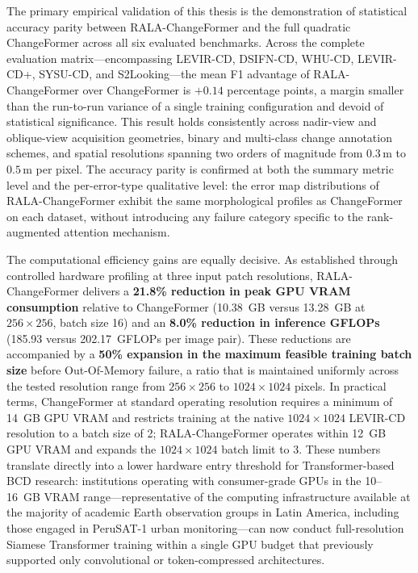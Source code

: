 The primary empirical validation of this thesis is the demonstration of
statistical accuracy parity between RALA-ChangeFormer and the full quadratic
ChangeFormer \cite{Bandara2022ChangeFormer} across all six evaluated benchmarks.
Across the complete evaluation matrix---encompassing LEVIR-CD, DSIFN-CD, WHU-CD,
LEVIR-CD+, SYSU-CD, and S2Looking---the mean F1 advantage of RALA-ChangeFormer
over ChangeFormer is $+0.14$ percentage points, a margin smaller than the
run-to-run variance of a single training configuration and devoid of statistical
significance. This result holds consistently across nadir-view and oblique-view
acquisition geometries, binary and multi-class change annotation schemes, and
spatial resolutions spanning two orders of magnitude from $0.3\,\mathrm{m}$ to
$0.5\,\mathrm{m}$ per pixel. The accuracy parity is confirmed at both the summary
metric level and the per-error-type qualitative level: the error map distributions
of RALA-ChangeFormer exhibit the same morphological profiles as ChangeFormer on
each dataset, without introducing any failure category specific to the
rank-augmented attention mechanism.

The computational efficiency gains are equally decisive. As established through
controlled hardware profiling at three input patch resolutions, RALA-ChangeFormer
delivers a \textbf{21.8\% reduction in peak GPU VRAM consumption} relative to
ChangeFormer (10.38~GB versus 13.28~GB at $256 \times 256$, batch size 16) and
an \textbf{8.0\% reduction in inference GFLOPs} (185.93 versus 202.17~GFLOPs
per image pair). These reductions are accompanied by a \textbf{50\% expansion
in the maximum feasible training batch size} before Out-Of-Memory failure, a
ratio that is maintained uniformly across the tested resolution range from
$256 \times 256$ to $1024 \times 1024$ pixels. In practical terms, ChangeFormer
at standard operating resolution requires a minimum of 14~GB GPU VRAM and
restricts training at the native $1024 \times 1024$ LEVIR-CD resolution to a
batch size of 2; RALA-ChangeFormer operates within 12~GB GPU VRAM and expands
the $1024 \times 1024$ batch limit to 3. These numbers translate directly into
a lower hardware entry threshold for Transformer-based BCD research: institutions
operating with consumer-grade GPUs in the 10--16~GB VRAM range---representative
of the computing infrastructure available at the majority of academic Earth
observation groups in Latin America, including those engaged in PeruSAT-1 urban
monitoring---can now conduct full-resolution Siamese Transformer training within
a single GPU budget that previously supported only convolutional or
token-compressed architectures.

